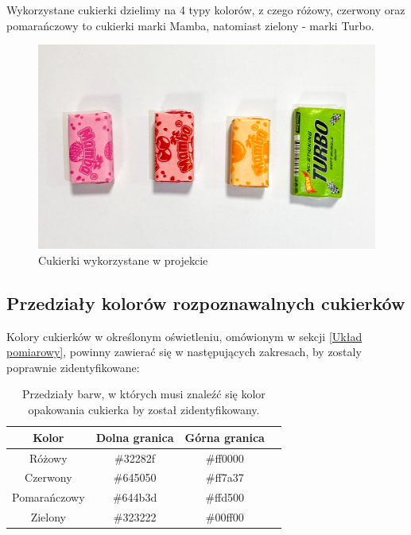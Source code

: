 \documentclass{article}
\begin{document}
Wykorzystane cukierki dzielimy na 4 typy kolorów, z czego różowy, czerwony oraz pomarańczowy to cukierki marki Mamba, natomiast zielony - marki Turbo.

\begin{figure}[H]
    \centering
    \includegraphics[width=\linewidth]{candies.jpg}
    \caption{Cukierki wykorzystane w projekcie}
\end{figure}


\subsection{Przedziały kolorów rozpoznawalnych cukierków}

Kolory cukierków w określonym oświetleniu, omówionym w sekcji \ref{Układ pomiarowy}, powinny zawierać się w następujących zakresach, by zostaly poprawnie zidentyfikowane:

\begin{table}[H]
    \label{tab:tab1}
    \centering
    \begin{tabular}{ |c|c|c|c| }
     \hline
     Kolor & Dolna granica & Górna granica \\
     \hline
     Różowy & \#32282f & \#ff0000 \\
     \hline
     Czerwony & \#645050 & \#ff7a37 \\
     \hline
     Pomarańczowy & \#644b3d & \#ffd500 \\
     \hline
     Zielony & \#323222 & \#00ff00 \\
     \hline
    \end{tabular}
    \caption{Przedziały barw, w których musi znaleźć się kolor opakowania cukierka by został zidentyfikowany.}
\end{table}
\end{document}
